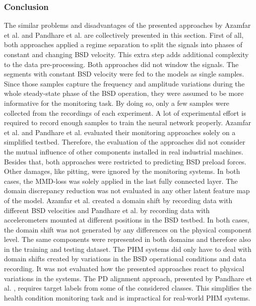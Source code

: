 \subsubsection{Conclusion}
The similar problems and disadvantages of the presented approaches by Azamfar et al. \cite{AZAMFAR2020103932} and Pandhare et al. \cite{Pandhare2021} are collectively presented in this section. First of all, both approaches applied a regime separation to split the signals into phases of constant and changing BSD velocity. This extra step adds additional complexity to the data pre-processing. Both approaches did not window the signals. The segments with constant BSD velocity were fed to the models as single samples. Since those samples capture the frequency and amplitude variations during the whole steady-state phase of the BSD operation, they were assumed to be more informative for the monitoring task. By doing so, only a few samples were collected from the recordings of each experiment. A lot of experimental effort is required to record enough samples to train the neural network properly. Azamfar et al. \cite{AZAMFAR2020103932} and  Pandhare et al. \cite{Pandhare2021} evaluated their monitoring approaches solely on a simplified testbed. Therefore, the evaluation of the approaches did not consider the mutual influence of other components installed in real industrial machines. Besides that, both approaches were restricted to predicting BSD preload forces. Other damages, like pitting, were ignored by the monitoring systems. In both cases, the MMD-loss was solely applied in the last fully connected layer. The domain discrepancy reduction was not evaluated in any other latent feature map of the model. Azamfar et al. \cite{AZAMFAR2020103932} created a domain shift by recording data with different BSD velocities and Pandhare et al. \cite{Pandhare2021} by recording data with accelerometers mounted at different positions in the BSD testbed. In both cases, the domain shift was not generated by any differences on the physical component level. The same components were represented in both domains and therefore also in the training and testing dataset. The PHM systems did only have to deal with domain shifts created by variations in the BSD operational conditions and data recording. It was not evaluated how the presented approaches react to physical variations in the systems. The PD alignment approach, presented by Pandhare et al. \cite{Pandhare2021}, requires target labels from some of the considered classes. This simplifies the health condition monitoring task and is impractical for real-world PHM systems.

